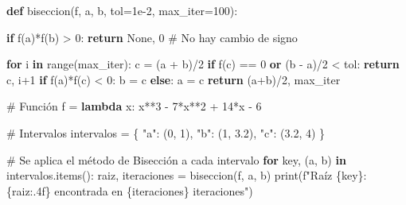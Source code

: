 \documentclass[
  english,
  letterpaper,
  DIV=11,
  numbers=noendperiod]{scrartcl}
\newenvironment{Shaded}{\begin{snugshade}}{\end{snugshade}}
\newcommand{\BuiltInTok}[1]{\textcolor[rgb]{0.00,0.23,0.31}{#1}}
\newcommand{\CommentTok}[1]{\textcolor[rgb]{0.37,0.37,0.37}{#1}}
\newcommand{\ControlFlowTok}[1]{\textcolor[rgb]{0.00,0.23,0.31}{\textbf{#1}}}
\newcommand{\DecValTok}[1]{\textcolor[rgb]{0.68,0.00,0.00}{#1}}
\newcommand{\FloatTok}[1]{\textcolor[rgb]{0.68,0.00,0.00}{#1}}
\newcommand{\KeywordTok}[1]{\textcolor[rgb]{0.00,0.23,0.31}{\textbf{#1}}}
\newcommand{\NormalTok}[1]{\textcolor[rgb]{0.00,0.23,0.31}{#1}}
\newcommand{\OperatorTok}[1]{\textcolor[rgb]{0.37,0.37,0.37}{#1}}
\newcommand{\SpecialCharTok}[1]{\textcolor[rgb]{0.37,0.37,0.37}{#1}}
\newcommand{\SpecialStringTok}[1]{\textcolor[rgb]{0.13,0.47,0.30}{#1}}
\newcommand{\StringTok}[1]{\textcolor[rgb]{0.13,0.47,0.30}{#1}}
\newcommand{\VariableTok}[1]{\textcolor[rgb]{0.07,0.07,0.07}{#1}}
\begin{document}
\begin{Shaded}
\begin{Highlighting}[]
\KeywordTok{def}\NormalTok{ biseccion(f, a, b, tol}\OperatorTok{=}\FloatTok{1e{-}2}\NormalTok{, max\_iter}\OperatorTok{=}\DecValTok{100}\NormalTok{):}
    
    \ControlFlowTok{if}\NormalTok{ f(a)}\OperatorTok{*}\NormalTok{f(b) }\OperatorTok{\textgreater{}} \DecValTok{0}\NormalTok{:}
        \ControlFlowTok{return} \VariableTok{None}\NormalTok{, }\DecValTok{0}  \CommentTok{\# No hay cambio de signo}
    
    \ControlFlowTok{for}\NormalTok{ i }\KeywordTok{in} \BuiltInTok{range}\NormalTok{(max\_iter):}
\NormalTok{        c }\OperatorTok{=}\NormalTok{ (a }\OperatorTok{+}\NormalTok{ b)}\OperatorTok{/}\DecValTok{2}
        \ControlFlowTok{if}\NormalTok{ f(c) }\OperatorTok{==} \DecValTok{0} \KeywordTok{or}\NormalTok{ (b }\OperatorTok{{-}}\NormalTok{ a)}\OperatorTok{/}\DecValTok{2} \OperatorTok{\textless{}}\NormalTok{ tol:}
            \ControlFlowTok{return}\NormalTok{ c, i}\OperatorTok{+}\DecValTok{1}
        \ControlFlowTok{if}\NormalTok{ f(a)}\OperatorTok{*}\NormalTok{f(c) }\OperatorTok{\textless{}} \DecValTok{0}\NormalTok{:}
\NormalTok{            b }\OperatorTok{=}\NormalTok{ c}
        \ControlFlowTok{else}\NormalTok{:}
\NormalTok{            a }\OperatorTok{=}\NormalTok{ c}
    \ControlFlowTok{return}\NormalTok{ (a}\OperatorTok{+}\NormalTok{b)}\OperatorTok{/}\DecValTok{2}\NormalTok{, max\_iter}

\CommentTok{\# Función}
\NormalTok{f }\OperatorTok{=} \KeywordTok{lambda}\NormalTok{ x: x}\OperatorTok{**}\DecValTok{3} \OperatorTok{{-}} \DecValTok{7}\OperatorTok{*}\NormalTok{x}\OperatorTok{**}\DecValTok{2} \OperatorTok{+} \DecValTok{14}\OperatorTok{*}\NormalTok{x }\OperatorTok{{-}} \DecValTok{6}

\CommentTok{\# Intervalos}
\NormalTok{intervalos }\OperatorTok{=}\NormalTok{ \{}
    \StringTok{"a"}\NormalTok{: (}\DecValTok{0}\NormalTok{, }\DecValTok{1}\NormalTok{),}
    \StringTok{"b"}\NormalTok{: (}\DecValTok{1}\NormalTok{, }\FloatTok{3.2}\NormalTok{),}
    \StringTok{"c"}\NormalTok{: (}\FloatTok{3.2}\NormalTok{, }\DecValTok{4}\NormalTok{)}
\NormalTok{\}}

\CommentTok{\# Se aplica el método de Bisección a cada intervalo}
\ControlFlowTok{for}\NormalTok{ key, (a, b) }\KeywordTok{in}\NormalTok{ intervalos.items():}
\NormalTok{    raiz, iteraciones }\OperatorTok{=}\NormalTok{ biseccion(f, a, b)}
    \BuiltInTok{print}\NormalTok{(}\SpecialStringTok{f"Raíz }\SpecialCharTok{\{}\NormalTok{key}\SpecialCharTok{\}}\SpecialStringTok{: }\SpecialCharTok{\{}\NormalTok{raiz}\SpecialCharTok{:.4f\}}\SpecialStringTok{ encontrada en }\SpecialCharTok{\{}\NormalTok{iteraciones}\SpecialCharTok{\}}\SpecialStringTok{ iteraciones"}\NormalTok{)}
\end{Highlighting}
\end{Shaded}
\end{document}
